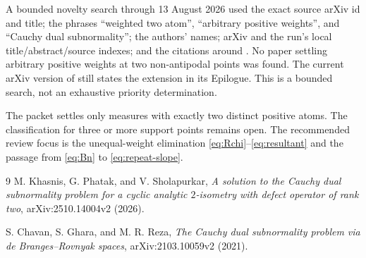 \documentclass[11pt]{article}
\begin{document}
A bounded novelty search through 13 August 2026 used the exact source arXiv
id and title; the phrases ``weighted two atom'', ``arbitrary positive
weights'', and ``Cauchy dual subnormality''; the authors' names; arXiv and
the run's local title/abstract/source indexes; and the citations around
\cite{KPS,CGR}.  No paper settling arbitrary positive weights at two
non-antipodal points was found.  The current arXiv version of \cite{KPS}
still states the extension in its Epilogue.  This is a bounded search, not
an exhaustive priority determination.

The packet settles only measures with exactly two distinct positive atoms.
The classification for three or more support points remains open.  The
recommended review focus is the unequal-weight elimination
\eqref{eq:Rchi}--\eqref{eq:resultant} and the passage from
\eqref{eq:Bn} to \eqref{eq:repeat-slope}.

\begin{thebibliography}{9}
M. Khasnis, G. Phatak, and V. Sholapurkar,
\emph{A solution to the Cauchy dual subnormality problem for a cyclic
analytic $2$-isometry with defect operator of rank two},
arXiv:2510.14004v2 (2026).

S. Chavan, S. Ghara, and M. R. Reza,
\emph{The Cauchy dual subnormality problem via de Branges--Rovnyak spaces},
arXiv:2103.10059v2 (2021).
\end{thebibliography}
\end{document}

